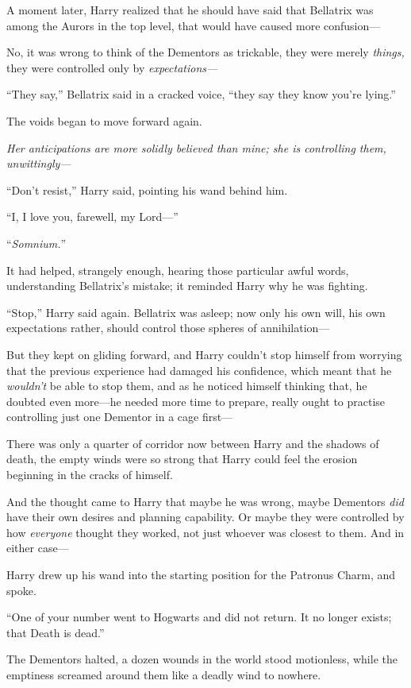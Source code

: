 A moment later, Harry realized that he should have said that Bellatrix was among the Aurors in the top level, that would have caused more confusion—

No, it was wrong to think of the Dementors as trickable, they were merely \emph{things,} they were controlled only by \emph{expectations—}

“They say,” Bellatrix said in a cracked voice, “they say they know you’re lying.”

The voids began to move forward again.

\emph{Her anticipations are more solidly believed than mine; she is controlling them, unwittingly—}

“Don’t resist,” Harry said, pointing his wand behind him.

“I, I love you, farewell, my Lord—”

“\emph{Somnium.}”

It had helped, strangely enough, hearing those particular awful words, understanding Bellatrix’s mistake; it reminded Harry why he was fighting.

“Stop,” Harry said again. Bellatrix was asleep; now only his own will, his own expectations rather, should control those spheres of annihilation—

But they kept on gliding forward, and Harry couldn’t stop himself from worrying that the previous experience had damaged his confidence, which meant that he \emph{wouldn’t} be able to stop them, and as he noticed himself thinking that, he doubted even more—he needed more time to prepare, really ought to practise controlling just one Dementor in a cage first—

There was only a quarter of corridor now between Harry and the shadows of death, the empty winds were so strong that Harry could feel the erosion beginning in the cracks of himself.

And the thought came to Harry that maybe he was wrong, maybe Dementors \emph{did} have their own desires and planning capability. Or maybe they were controlled by how \emph{everyone} thought they worked, not just whoever was closest to them. And in either case—

Harry drew up his wand into the starting position for the Patronus Charm, and spoke.

“One of your number went to Hogwarts and did not return. It no longer exists; that Death is dead.”

The Dementors halted, a dozen wounds in the world stood motionless, while the emptiness screamed around them like a deadly wind to nowhere.

